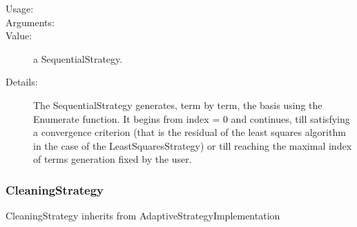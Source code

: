 \begin{description}
\item[Usage:] \rule{0pt}{1em}

\item[Arguments:]  \rule{0pt}{1em}

\item[Value:] a SequentialStrategy.

\item[Details:] The SequentialStrategy  generates, term by term, the basis using the Enumerate function. It begins from index = 0 and continues, till satisfying a convergence criterion (that is the residual of the least squares algorithm in the case of the LeastSquaresStrategy) or till reaching the maximal index of terms generation fixed by the user.
\end{description}





\newpage
\subsubsection{CleaningStrategy}

CleaningStrategy inherits from AdaptiveStrategyImplementation


